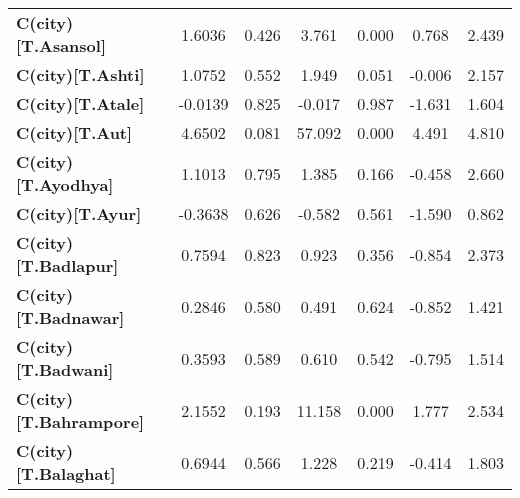 \begin{center}
\begin{tabular}{lcccccc}
\textbf{C(city)[T.Asansol]}                                                                         &       1.6036  &        0.426     &     3.761  &         0.000        &        0.768    &        2.439     \\
\textbf{C(city)[T.Ashti]}                                                                           &       1.0752  &        0.552     &     1.949  &         0.051        &       -0.006    &        2.157     \\
\textbf{C(city)[T.Atale]}                                                                           &      -0.0139  &        0.825     &    -0.017  &         0.987        &       -1.631    &        1.604     \\
\textbf{C(city)[T.Aut]}                                                                             &       4.6502  &        0.081     &    57.092  &         0.000        &        4.491    &        4.810     \\
\textbf{C(city)[T.Ayodhya]}                                                                         &       1.1013  &        0.795     &     1.385  &         0.166        &       -0.458    &        2.660     \\
\textbf{C(city)[T.Ayur]}                                                                            &      -0.3638  &        0.626     &    -0.582  &         0.561        &       -1.590    &        0.862     \\
\textbf{C(city)[T.Badlapur]}                                                                        &       0.7594  &        0.823     &     0.923  &         0.356        &       -0.854    &        2.373     \\
\textbf{C(city)[T.Badnawar]}                                                                        &       0.2846  &        0.580     &     0.491  &         0.624        &       -0.852    &        1.421     \\
\textbf{C(city)[T.Badwani]}                                                                         &       0.3593  &        0.589     &     0.610  &         0.542        &       -0.795    &        1.514     \\
\textbf{C(city)[T.Bahrampore]}                                                                      &       2.1552  &        0.193     &    11.158  &         0.000        &        1.777    &        2.534     \\
\textbf{C(city)[T.Balaghat]}                                                                        &       0.6944  &        0.566     &     1.228  &         0.219        &       -0.414    &        1.803     \\

\end{tabular}
\end{center}
